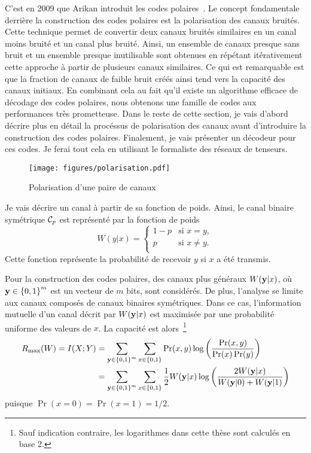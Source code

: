 C'est en 2009 que Arikan introduit les codes polaires~\cite{arikan_channel_2009}.
Le concept fondamentale derrière la construction des codes polaires est la polarisation
des canaux bruités.
Cette technique permet de convertir deux canaux bruités similaires en un canal moins bruité
et un canal plus bruité.
Ainsi,
un ensemble de canaux presque sans bruit et un ensemble presque inutilisable
sont obtenues en répétant itérativement cette approche à partir de plusieurs canaux similaires.
Ce qui est remarquable est que la fraction de canaux de faible bruit créés ainsi
tend vers la capacité des canaux initiaux.
En combinant cela au fait qu'il existe un algorithme efficace de décodage des codes polaires,
nous obtenons une famille de codes aux performances très prometteuse.
Dans le reste de cette section,
je vais d'abord décrire plus en détail la procéssus de polarisation des canaux avant
d'introduire la construction des codes polaires.
Finalement, je vais présenter un décodeur pour ces codes.
Je ferai tout cela en utilisant le formaliste des réseaux de tenseurs.

\begin{figure}[t]
  \begin{center}
    \texttt{[image: figures/polarisation.pdf]}
  \end{center}
  \caption{Polarisation d'une paire de canaux}
  \label{fig:polarisation}
\end{figure}

Je vais décrire un canal à partir de sa fonction de poids. 
Ainsi,
le canal binaire symétrique $\mathcal{C}_p$ est représenté par la fonction de poids
\begin{equation}
  W(y|x) =
  \begin{cases}
    1 - p & \text{si } x = y,\\
    p & \text{si } x \neq y.\\
  \end{cases}
\end{equation}
Cette fonction représente la probabilité de recevoir $y$ si $x$ a été transmis.

Pour la construction des codes polaires,
des canaux plus généraux $W(\vb y | x)$,
où $\vb y \in \qty{0, 1}^m$ est un vecteur de $m$ bits,
sont considérés.
De plus, 
l'analyse se limite aux canaux composés de canaux binaires symétriques.
Dans ce cas, l'information mutuelle d'un canal décrit par $W(\vb y | x)$
est maximisée par une probabilité uniforme des valeurs de $x$.
La capacité est alors~\footnote{
  Sauf indication contraire, les logarithmes dans cette thèse sont calculés en base 2.
}
\begin{align}
  R_{\text{max}}(W) 
  = I(X ; Y)
  &= \sum_{\vb y \in \qty{0, 1}^m}\sum_{x \in \qty{0, 1}} 
  \Pr(x, y) \log\qty(\frac{\Pr(x, y)}{\Pr(x) \Pr(y)})\notag\\
  &= \sum_{\vb y \in \qty{0, 1}^m}\sum_{x \in \qty{0, 1}} 
  \frac{1}{2}W(\vb y | x) \log\qty(\frac{2 W(\vb y | x)}{W(\vb y | 0) + W(\vb y | 1)})
  \label{eq:capacite_symetrique}
\end{align}
puisque $\Pr(x = 0) = \Pr(x = 1) = 1/2$.

